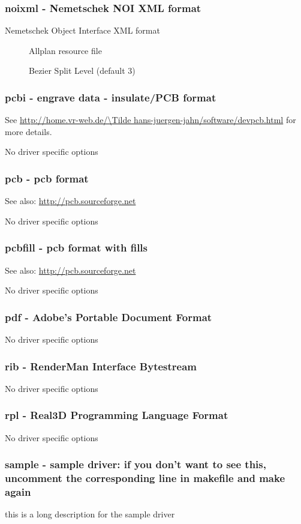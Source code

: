 \documentclass[english,a4paper]{article}
\let\URL\url \let\Email\url \let\File\url
\begin{document}
\subsubsection{noixml - Nemetschek NOI XML format}
Nemetschek Object Interface XML format

\begin{description}
\item[] 
Allplan resource file


\item[] 
Bezier Split Level (default 3)


\end{description}
\subsubsection{pcbi - engrave data - insulate/PCB format}
See \URL{http://home.vr-web.de/\Tilde hans-juergen-jahn/software/devpcb.html} for more details.

No driver specific options
\subsubsection{pcb - pcb format}
See also: \URL{http://pcb.sourceforge.net} 

No driver specific options
\subsubsection{pcbfill - pcb format with fills}
See also: \URL{http://pcb.sourceforge.net} 

No driver specific options
\subsubsection{pdf - Adobe's Portable Document Format}
No driver specific options
\subsubsection{rib - RenderMan Interface Bytestream}
No driver specific options
\subsubsection{rpl - Real3D Programming Language Format}
No driver specific options
\subsubsection{sample - sample driver: if you don't want to see this, uncomment the corresponding line in makefile and make again}
this is a long description for the sample driver
\end{document}

